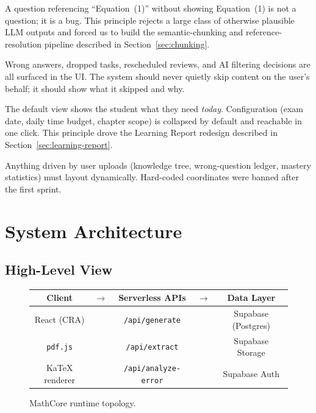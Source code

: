 \documentclass[11pt,a4paper]{article}
\newcommand{\code}[1]{\texttt{\small #1}}
\begin{document}
\begin{tcolorbox}[principle,title=P2. Every Question Must Be Self-Contained]
A question referencing ``Equation~(1)'' without showing Equation~(1) is not a question; it is a bug. This principle rejects a large class of otherwise plausible LLM outputs and forced us to build the semantic-chunking and reference-resolution pipeline described in Section~\ref{sec:chunking}.
\end{tcolorbox}

\begin{tcolorbox}[principle,title=P3. Transparent Feedback Loops]
Wrong answers, dropped tasks, rescheduled reviews, and AI filtering decisions are all surfaced in the UI. The system should never quietly skip content on the user's behalf; it should show what it skipped and why.
\end{tcolorbox}

\begin{tcolorbox}[principle,title=P4. Progressive Disclosure]
The default view shows the student what they need \emph{today}. Configuration (exam date, daily time budget, chapter scope) is collapsed by default and reachable in one click. This principle drove the Learning Report redesign described in Section~\ref{sec:learning-report}.
\end{tcolorbox}

\begin{tcolorbox}[principle,title=P5. The Canvas Must Grow With the Content]
Anything driven by user uploads (knowledge tree, wrong-question ledger, mastery statistics) must layout dynamically. Hard-coded coordinates were banned after the first sprint.
\end{tcolorbox}

\section{System Architecture}
\label{sec:architecture}

\subsection{High-Level View}

\begin{figure}[h]
\centering
\begin{tabular}{|c|c|c|c|c|}
\hline
\textbf{Client} & $\rightarrow$ & \textbf{Serverless APIs} & $\rightarrow$ & \textbf{Data Layer} \\
\hline
React (CRA) & & \code{/api/generate} & & Supabase (Postgres) \\
\code{pdf.js} & & \code{/api/extract} & & Supabase Storage \\
KaTeX renderer & & \code{/api/analyze-error} & & Supabase Auth \\
\hline
\end{tabular}
\caption{MathCore runtime topology.}
\end{figure}
\end{document}
